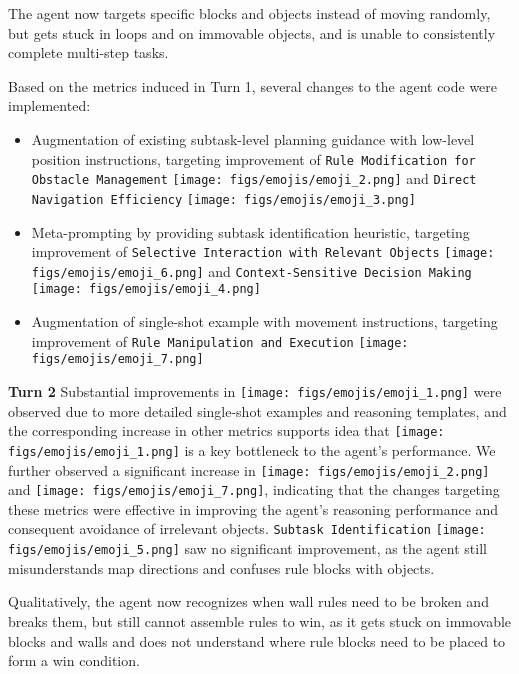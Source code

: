 The agent now targets specific blocks and objects instead of moving randomly, but gets stuck in loops and on immovable objects, and is unable to consistently complete multi-step tasks.

Based on the metrics induced in Turn 1, several changes to the agent code were implemented:
\begin{itemize}
    \item Augmentation of existing subtask-level planning guidance with low-level position instructions, targeting improvement of \texttt{Rule Modification for Obstacle Management} \texttt{[image: figs/emojis/emoji\_2.png]} and \texttt{Direct Navigation Efficiency} \texttt{[image: figs/emojis/emoji\_3.png]}
    \item Meta-prompting \cite{Suzgun_Kalai_2024} by providing subtask identification heuristic, targeting improvement of \texttt{Selective Interaction with Relevant Objects} \texttt{[image: figs/emojis/emoji\_6.png]} and \texttt{Context-Sensitive Decision Making} \texttt{[image: figs/emojis/emoji\_4.png]}
    \item Augmentation of single-shot example with movement instructions, targeting improvement of \texttt{Rule Manipulation and Execution} \texttt{[image: figs/emojis/emoji\_7.png]}
\end{itemize}


\textbf{Turn 2}
Substantial improvements in \texttt{[image: figs/emojis/emoji\_1.png]} were observed due to more detailed single-shot examples and reasoning templates, and the corresponding increase in other metrics supports idea that \texttt{[image: figs/emojis/emoji\_1.png]} is a key bottleneck to the agent's performance. We further observed a significant increase in \texttt{[image: figs/emojis/emoji\_2.png]} and \texttt{[image: figs/emojis/emoji\_7.png]}, indicating that the changes targeting these metrics were effective in improving the agent's reasoning performance and consequent avoidance of irrelevant objects. \texttt{Subtask Identification} \texttt{[image: figs/emojis/emoji\_5.png]} saw no significant improvement, as the agent still misunderstands map directions and confuses rule blocks with objects. 

Qualitatively, the agent now recognizes when wall rules need to be broken and breaks them, but still cannot assemble rules to win, as it gets stuck on immovable blocks and walls and does not understand where rule blocks need to be placed to form a win condition.


